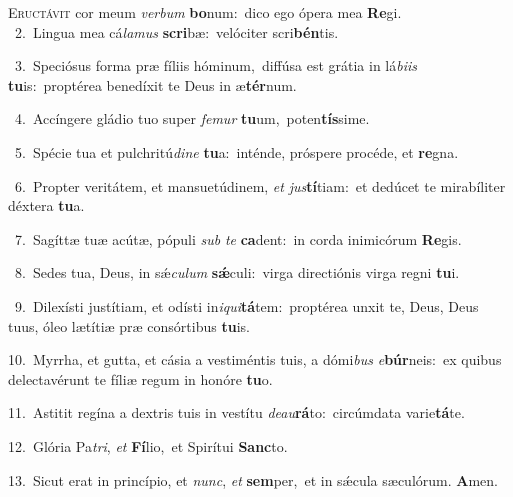 \lettrine{\initial\textcolor{\initialcolor}{E}}{ructávit} cor meum \textit{ver}\-\textit{bum} \textbf{bo}\-num:~\star dico ego ópera mea \textbf{Re}\-gi.\\
{\numbfont\textcolor{\numbcolor}{~2.}}~Lingua mea cá\-\textit{la}\-\textit{mus} \textbf{scri}\-bæ:~\star velóciter scri\-\textbf{bén}\-tis.\par
{\numbfont\textcolor{\numbcolor}{~3.}}~Speciósus forma præ fíliis hóminum,~\dagger diffúsa est grátia in lá\-\textit{bi}\-\textit{is} \textbf{tu}\-is:~\star proptérea benedíxit te Deus in æ\-\textbf{tér}\-num.\par
{\numbfont\textcolor{\numbcolor}{~4.}}~Accíngere gládio tuo super \textit{fe}\-\textit{mur} \textbf{tu}\-um,~\star poten\-\textbf{tís}\-sime.\par
{\numbfont\textcolor{\numbcolor}{~5.}}~Spécie tua et pulchritú\-\textit{di}\-\textit{ne} \textbf{tu}\-a:~\star inténde, próspere procéde, et \textbf{re}\-gna.\par
{\numbfont\textcolor{\numbcolor}{~6.}}~Propter veritátem, et mansuetúdinem, \textit{et} \textit{jus}\-\textbf{tí}tiam:~\star et dedúcet te mirabíliter déxtera \textbf{tu}\-a.\par
{\numbfont\textcolor{\numbcolor}{~7.}}~Sagíttæ tuæ acútæ, pópuli \textit{sub} \textit{te} \textbf{ca}\-dent:~\star in corda inimicórum \textbf{Re}\-gis.\par
{\numbfont\textcolor{\numbcolor}{~8.}}~Sedes tua, Deus, in sǽ\-\textit{cu}\-\textit{lum} \textbf{sǽ}\-culi:~\star virga directiónis virga regni \textbf{tu}\-i.\par
{\numbfont\textcolor{\numbcolor}{~9.}}~Dilexísti justítiam, et odísti in\-\textit{i}\-\textit{qui}\textbf{tá}tem:~\star proptérea unxit te, Deus, Deus tuus, óleo lætítiæ præ consórtibus \textbf{tu}\-is.\par
{\numbfont\textcolor{\numbcolor}{10.}}~Myrrha, et gutta, et cásia a vestiméntis tuis, a dómi\textit{bus} \textit{e}\-\textbf{búr}neis:~\star ex quibus delectavérunt te fíliæ regum in honóre \textbf{tu}\-o.\par
{\numbfont\textcolor{\numbcolor}{11.}}~Astitit regína a dextris tuis in vestítu \textit{de}\-\textit{au}\textbf{rá}to:~\star circúmdata varie\-\textbf{tá}\-te.\par
{\numbfont\textcolor{\numbcolor}{12.}}~Glória Pa\-\textit{tri}\-, \textit{et} \textbf{Fí}\-lio,~\star et Spirítui \textbf{Sanc}\-to.\par
{\numbfont\textcolor{\numbcolor}{13.}}~Sicut erat in princípio, et \textit{nunc}\-, \textit{et} \textbf{sem}\-per,~\star et in sǽcula sæculórum. \textbf{A}\-men.\par
